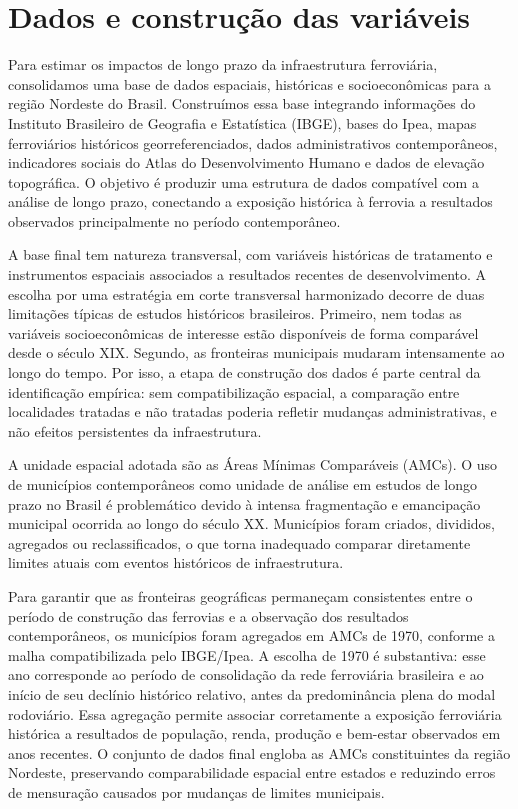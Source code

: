\documentclass[12pt,a4paper]{article}
\begin{document}
\section{Dados e construção das variáveis}

Para estimar os impactos de longo prazo da infraestrutura ferroviária, consolidamos uma base de dados espaciais, históricas e socioeconômicas para a região Nordeste do Brasil. Construímos essa base integrando informações do Instituto Brasileiro de Geografia e Estatística (IBGE), bases do Ipea, mapas ferroviários históricos georreferenciados, dados administrativos contemporâneos, indicadores sociais do Atlas do Desenvolvimento Humano e dados de elevação topográfica. O objetivo é produzir uma estrutura de dados compatível com a análise de longo prazo, conectando a exposição histórica à ferrovia a resultados observados principalmente no período contemporâneo.

A base final tem natureza transversal, com variáveis históricas de tratamento e instrumentos espaciais associados a resultados recentes de desenvolvimento. A escolha por uma estratégia em corte transversal harmonizado decorre de duas limitações típicas de estudos históricos brasileiros. Primeiro, nem todas as variáveis socioeconômicas de interesse estão disponíveis de forma comparável desde o século XIX. Segundo, as fronteiras municipais mudaram intensamente ao longo do tempo. Por isso, a etapa de construção dos dados é parte central da identificação empírica: sem compatibilização espacial, a comparação entre localidades tratadas e não tratadas poderia refletir mudanças administrativas, e não efeitos persistentes da infraestrutura.


A unidade espacial adotada são as Áreas Mínimas Comparáveis (AMCs). O uso de municípios contemporâneos como unidade de análise em estudos de longo prazo no Brasil é problemático devido à intensa fragmentação e emancipação municipal ocorrida ao longo do século XX. Municípios foram criados, divididos, agregados ou reclassificados, o que torna inadequado comparar diretamente limites atuais com eventos históricos de infraestrutura.

Para garantir que as fronteiras geográficas permaneçam consistentes entre o período de construção das ferrovias e a observação dos resultados contemporâneos, os municípios foram agregados em AMCs de 1970, conforme a malha compatibilizada pelo IBGE/Ipea. A escolha de 1970 é substantiva: esse ano corresponde ao período de consolidação da rede ferroviária brasileira e ao início de seu declínio histórico relativo, antes da predominância plena do modal rodoviário. Essa agregação permite associar corretamente a exposição ferroviária histórica a resultados de população, renda, produção e bem-estar observados em anos recentes. O conjunto de dados final engloba as AMCs constituintes da região Nordeste, preservando comparabilidade espacial entre estados e reduzindo erros de mensuração causados por mudanças de limites municipais.
\end{document}

